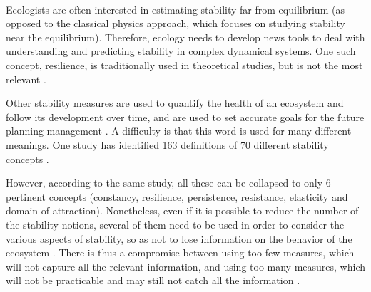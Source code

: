 \documentclass{article}
\begin{document}
\paragraph{}
\label{stability_litterature}
Ecologists are often interested in estimating stability far from equilibrium (as opposed to the classical physics approach, which focuses on studying stability near the equilibrium). Therefore, ecology needs to develop news tools to deal with understanding and predicting stability in complex dynamical systems. 
One such concept, resilience, is traditionally used in theoretical studies, but is not the most relevant %
\cite{gunderson_ecological_2000} \cite{neubert_alternatives_1997}.

Other stability measures are used to quantify the health of an ecosystem and follow its development over time, and are used to set accurate goals for the future planning management \cite {donohue_navigating_2016} \cite{mayer_strengths_2008}. A difficulty is that this word is used for many different meanings. One study has identified 163 definitions of 70 different stability concepts \cite{grimm_babel_1997}.

However, according to the same study, all these can be collapsed to only 6 pertinent concepts (constancy,  resilience,  persistence,  resistance,  elasticity and domain of attraction). Nonetheless, even if it is possible to reduce the number of the stability notions, several of them need to be used in order to consider the various aspects of stability, so as not to lose information on the behavior of the ecosystem \cite{derissen_relationship_2011}. There is thus a compromise between using too few measures, which will not capture all the relevant information, and using too many measures, which will not be practicable and may still not catch all the information \cite{hillebrand_decomposing_2018} \cite{donohue_dimensionality_2013}.





\paragraph{}
\end{document}
